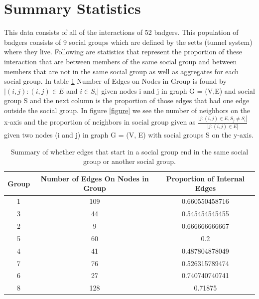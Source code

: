 \documentclass[11pt]{article}
\begin{document}
\section{Summary Statistics}
This data consists of all of the interactions of 52 badgers.  This population of badgers consists of 9 social groups which are defined by the setts (tunnel system) where they live.  Following are statistics that represent the proportion of these interaction that are between members of the same social group and between members that are not in the same social group as well as aggregates for each social group.  In table \ref{table} Number of Edges on Nodes in Group is found by $|(i,j) : (i,j) \in E$ and $  i \in S_i| $ given nodes i and j in graph G = (V,E) and social group S and the next column is the proportion of those edges that had one edge outside the social group.  In figure \ref{figure} we see the number of neighbors on the x-axis and the proportion of neighbors in social group given as $\frac{|j: (i,j) \in E, S_j \neq S_i |}{|j: (i,j) \in E| }$ given two nodes (i and j) in graph G = (V, E) with social groups S on the y-axis.


\begin{table}[h]
\centering
\label{table}
\caption{Summary of whether edges that start in a social group end in the same social group or another social group.}
\begin{tabular}{| c | c | c  | }
\hline
Group & Number of Edges On Nodes in Group & Proportion of Internal Edges\\
\hline
1 & 109 & 0.660550458716 \\
\hline
3 & 44 & 0.545454545455 \\
\hline
2 & 9 & 0.666666666667 \\
\hline
5 & 60 & 0.2 \\
\hline
4 & 41 & 0.487804878049 \\
\hline
7 & 76 & 0.526315789474 \\
\hline
6 & 27 & 0.740740740741 \\
\hline
8 & 128 & 0.71875\\
\hline
\end{tabular}
\end{table}
\end{document}
